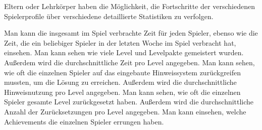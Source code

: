 \begin{requirements}
	Eltern oder Lehrkörper haben die Möglichkeit, die Fortschritte der verschiedenen Spielerprofile über verschiedene detaillierte Statistiken zu verfolgen.
	\begin{requirements}
		 Man kann die insgesamt im Spiel verbrachte Zeit für jeden Spieler, ebenso wie die Zeit, die ein beliebiger Spieler in der letzten Woche im Spiel verbracht hat, einsehen.
		 Man kann sehen wie viele Level und Levelpakte gemeistert wurden.
		Außerdem wird die durchschnittliche Zeit pro Level angegeben.
		 Man kann sehen, wie oft die einzelnen Spieler auf das eingebaute Hinweissystem zurückgreifen mussten, um die Lösung zu erreichen.
		Außerdem wird die durchschnittliche Hinweisnutzung pro Level angegeben.
		 Man kann sehen, wie oft die einzelnen Spieler gesamte Level zurückgesetzt haben.
		Außerdem wird die durchschnittliche Anzahl der Zurücksetzungen pro Level angegeben.
		 Man kann einsehen, welche Achievements die einzelnen Spieler errungen haben.
	\end{requirements}
\end{requirements}

